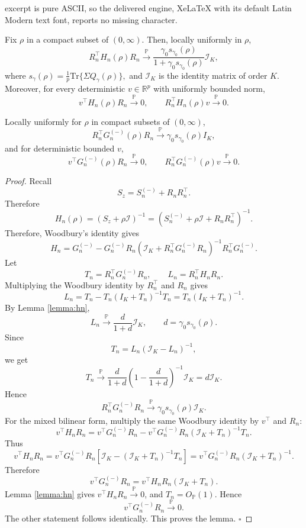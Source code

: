 \documentclass[10pt,a4paper]{amsart}
\def \I{\mathcal{I}}
\def \P{\mathbb{P}}
\def \tr {\mathrm{Tr}}
\begin{document}
excerpt is pure ASCII, so the delivered engine, XeLaTeX with its default Latin Modern text font, reports no missing character.
\begin{lemma}\label{lemma:hn}
    Fix \(\rho\) in a compact subset of \((0,\infty)\). Then, locally uniformly in \(\rho\),
\[
R_n^\top H_n(\rho)R_n
\overset{\P}{\longrightarrow}
\frac{\gamma_0s_{\gamma_0}(\rho)}
{1+\gamma_0s_{\gamma_0}(\rho)}
\I_K,
\]
where $s_\gamma(\rho)
    =
    \frac1p\tr\{\Sigma Q_\gamma(\rho)\},$ and $\I_K$ is the identity matrix of order $K$.
Moreover, for every deterministic \(v\in\mathbb R^p\) with uniformly bounded norm,
\[
v^\top H_n(\rho)R_n
\overset{\P}{\longrightarrow}0,
\qquad
R_n^\top H_n(\rho)v
\overset{\P}{\longrightarrow}0.
\]

\end{lemma}

\begin{lemma}\label{lemma:hn_gn}
    Locally uniformly for \(\rho\) in compact subsets of \((0,\infty)\),
\[
R_n^\top G_n^{(-)}(\rho)R_n
\overset{\P}{\longrightarrow}
\gamma_0s_{\gamma_0}(\rho)I_K,
\]
and for deterministic bounded \(v\),
\[
v^\top G_n^{(-)}(\rho)R_n\overset{\P}{\longrightarrow}0,
\qquad
R_n^\top G_n^{(-)}(\rho)v\overset{\P}{\longrightarrow}0.
\]
\end{lemma}

\begin{proof}
    Recall
\[
S_z=S_n^{(-)}+R_nR_n^\top.
\]
Therefore
\[
H_n(\rho)
=
(S_z+\rho \I)^{-1}
=
(S_n^{(-)}+\rho \I+R_nR_n^\top)^{-1}.
\]
Therefore, Woodbury's identity gives
\[
H_n
=
G_n^{(-)}
-
G_n^{(-)}R_n
\left(\I_K+R_n^\top G_n^{(-)}R_n\right)^{-1}
R_n^\top G_n^{(-)}.
\]
Let
\[
T_n=R_n^\top G_n^{(-)}R_n,
\qquad
L_n=R_n^\top H_nR_n.
\]
Multiplying the Woodbury identity by \(R_n^\top\) and \(R_n\) gives
\[
L_n
=
T_n-T_n(I_K+T_n)^{-1}T_n
=
T_n(I_K+T_n)^{-1}.
\]
By Lemma \ref{lemma:hn},
\[
L_n
\stackrel{\P}{\to}
\frac{d}{1+d}\I_K,
\qquad
d=\gamma_0s_{\gamma_0}(\rho).
\]
Since
\[
T_n=L_n(\I_K-L_n)^{-1},
\]
we get
\[
T_n
\stackrel{\P}{\to}
\frac{d}{1+d}
\left(1-\frac{d}{1+d}\right)^{-1}
\I_K
=
d\I_K.
\]
Hence
\[
R_n^\top G_n^{(-)}R_n
\stackrel{\P}{\to}
\gamma_0s_{\gamma_0}(\rho)\I_K.
\]
For the mixed bilinear form, multiply the same Woodbury identity by \(v^\top\) and \(R_n\):
\[
v^\top H_nR_n
=
v^\top G_n^{(-)}R_n
-
v^\top G_n^{(-)}R_n(\I_K+T_n)^{-1}T_n.
\]
Thus
\[
v^\top H_nR_n
=
v^\top G_n^{(-)}R_n
\left[
\I_K-(\I_K+T_n)^{-1}T_n
\right]
=
v^\top G_n^{(-)}R_n(\I_K+T_n)^{-1}.
\]
Therefore
\[
v^\top G_n^{(-)}R_n
=
v^\top H_nR_n(\I_K+T_n).
\]
Lemma \ref{lemma:hn} gives \(v^\top H_nR_n\stackrel{\P}{\to}0\), and \(T_n=O_{\P}(1)\). Hence
\[
v^\top G_n^{(-)}R_n\stackrel{\P}{\to}0.
\]
The other statement follows identically. This proves the lemma.
\(\square\)
\end{proof}
\end{document}
